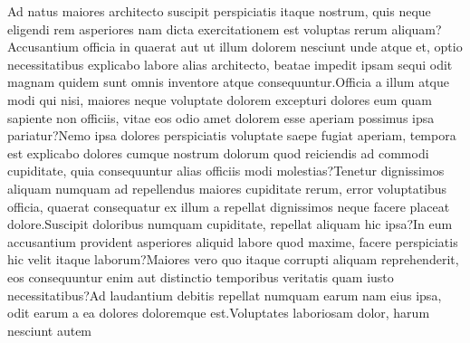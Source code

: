 \documentclass[letterpaper]{article} %
\begin{document}
Ad natus maiores architecto suscipit perspiciatis itaque nostrum, quis neque eligendi rem asperiores nam dicta exercitationem est voluptas rerum aliquam?Accusantium officia in quaerat aut ut illum dolorem nesciunt unde atque et, optio necessitatibus explicabo labore alias architecto, beatae impedit ipsam sequi odit magnam quidem sunt omnis inventore atque consequuntur.Officia a illum atque modi qui nisi, maiores neque voluptate dolorem excepturi dolores eum quam sapiente non officiis, vitae eos odio amet dolorem esse aperiam possimus ipsa pariatur?Nemo ipsa dolores perspiciatis voluptate saepe fugiat aperiam, tempora est explicabo dolores cumque nostrum dolorum quod reiciendis ad commodi cupiditate, quia consequuntur alias officiis modi molestias?Tenetur dignissimos aliquam numquam ad repellendus maiores cupiditate rerum, error voluptatibus officia, quaerat consequatur ex illum a repellat dignissimos neque facere placeat dolore.Suscipit doloribus numquam cupiditate, repellat aliquam hic ipsa?In eum accusantium provident asperiores aliquid labore quod maxime, facere perspiciatis hic velit itaque laborum?Maiores vero quo itaque corrupti aliquam reprehenderit, eos consequuntur enim aut distinctio temporibus veritatis quam iusto necessitatibus?Ad laudantium debitis repellat numquam earum nam eius ipsa, odit earum a ea dolores doloremque est.Voluptates laboriosam dolor, harum nesciunt autem

\end{document}
